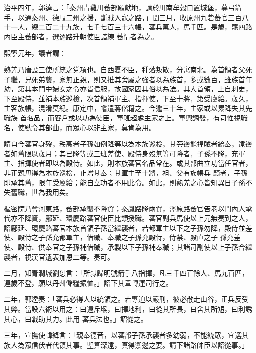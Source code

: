 \begin{pinyinscope}
 治平四年，郭逵言：「秦州青雞川蕃部願獻地，請於川南牟穀口置城堡，募弓箭手，以通秦州、德順二州之援，斷賊入寇之路，」閏三月，收原州九砦蕃官三百八十一人，總二百二十九族，七千七百三十六帳，蕃兵萬人，馬千匹。是歲，罷四路內臣主蕃部者，選逐路升朝使臣諳練
 蕃情者為之。



 熙寧元年，議者謂：



 熟羌乃唐設三使所統之党項也。自西夏不臣，種落叛散，分寓南北。為首領者父死子繼，兄死弟襲，家無正親，則又推其旁屬之強者以為族首，多或數百，雖族首年幼，第其本門中婦女之令亦皆信服，故國家因其俗以為法。其大首領，上自刺史，下至殿侍，並補本族巡檢，次首領補軍主、指揮使，下至十將，第受廩給。歲久，主客族帳，混淆莫紀。康定中，嚐遣蔣偕籍之。今逾三十年，主家或以累降失其先職族
 首名品，而客戶或以功為使臣，軍班超處主家之上。軍興調發，有司惟視職名，使號令其部曲，而眾心以非主家，莫肯為用。



 請自今蕃官身歿，秩高者子孫如例降等以為本族巡檢，其旁邊能捍賊者給奉，遠邊者如舊限以歲月；其已降等或三班差使、殿侍身歿無等可降者，子孫不降，充軍主、指揮使者即以為殿侍。如此，則本族蕃官名品常在。或其部曲立功當任官者，非正親毋得為本族巡檢，止增其奉；其軍主至十將，祖、父有族帳兵
 騎者，子孫即承其舊，限年受廩給；能自立功者不用此令。如此，則熟羌之心皆知異日子孫不失舊職，世為我用矣。



 樞密院乃會河東路，蕃部承襲不降資；秦鳳路降兩資，涇原路蕃官告老以門內人承代亦不降資，鄜延、環慶路蕃官使臣比類授職。蕃官副兵馬使以上元無奏到之人，詔鄜延、環慶路蕃官本族首領子孫當繼襲者，若都軍主以下之子孫勿降，殿侍並差使、殿侍之子孫充都軍主，借職、奉職之子孫充殿侍，侍禁、殿直之子
 孫充差使、殿侍、供奉官之子孫補借職，承製以下子孫補奉職；其諸司副使以上子孫合繼襲者，視漢官遺表加恩二等。奏可。



 二月，知青澗城劉怤言：「所隸歸明號箭手八指揮，凡三千四百餘人、馬九百匹，連歲不登，願以丹州儲糧振恤。」詔下其章轉運司行之。



 二年，郭逵奏：「蕃兵必得人以統領之。若專迫以嚴刑，彼必散走山谷，正兵反受其弊。當設六術以用之：曰遠斥堠，曰擇地利，曰從其所長，曰舍其所短，曰利誘其心，曰戰助其力。此用
 蕃兵法也。」詔從之。



 三年，宣撫使韓絳言：「親奉德音，以蕃部子孫承襲者多幼弱，不能統眾，宜選其族人為眾信伏者代領其事。聖算深遠，真得禦邊之要。請下諸路帥臣以詔從事。」




\end{pinyinscope}
